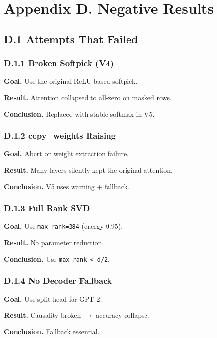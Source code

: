 \section{Appendix D. Negative Results}

\subsection{D.1 Attempts That Failed}

\subsubsection{D.1.1 Broken Softpick (V4)}

\textbf{Goal.} Use the original ReLU-based softpick.

\textbf{Result.} Attention collapsed to all-zero on masked rows.

\textbf{Conclusion.} Replaced with stable softmax in V5.

\subsubsection{D.1.2 copy\_weights Raising}

\textbf{Goal.} Abort on weight extraction failure.

\textbf{Result.} Many layers silently kept the original attention.

\textbf{Conclusion.} V5 uses warning + fallback.

\subsubsection{D.1.3 Full Rank SVD}

\textbf{Goal.} Use \texttt{max\_rank=384} (energy 0.95).

\textbf{Result.} No parameter reduction.

\textbf{Conclusion.} Use \texttt{max\_rank \textless{} d/2}.

\subsubsection{D.1.4 No Decoder Fallback}

\textbf{Goal.} Use split-head for GPT-2.

\textbf{Result.} Causality broken $\to$ accuracy collapse.

\textbf{Conclusion.} Fallback essential.

